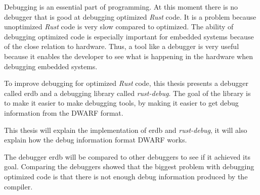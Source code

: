 Debugging is an essential part of programming.
At this moment there is no debugger that is good at debugging optimized \emph{Rust} code.
It is a problem because unoptimized \emph{Rust} code is very slow compared to optimized.
The ability of debugging optimized code is especially important for embedded systems because of the close relation to hardware.
Thus, a tool like a debugger is very useful because it enables the developer to see what is happening in the hardware when debugging embedded systems.


To improve debugging for optimized \emph{Rust} code, this thesis presents a debugger called \acrshort{erdb} and a debugging library called \emph{rust-debug}.
The goal of the library is to make it easier to make debugging tools, by making it easier to get debug information from the \acrshort{DWARF} format.


This thesis will explain the implementation of \acrshort{erdb} and \emph{rust-debug}, it will also explain how the debug information format \acrshort{DWARF} works.


The debugger \acrshort{erdb} will be compared to other debuggers to see if it achieved its goal.
Comparing the debuggers showed that the biggest problem with debugging optimized code is that there is not enough debug information produced by the compiler.

